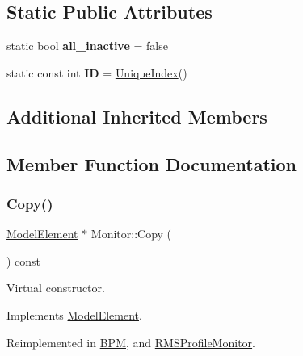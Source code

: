 \subsection*{Static Public Attributes}
\begin{DoxyCompactItemize}
\item 
\mbox{\label{classMonitor_a039390f890a247be2044b1be22611132}} 
static bool {\bfseries all\+\_\+inactive} = false
\item 
\mbox{\label{classMonitor_a4e03289570053fc98b3e290acb33868c}} 
static const int {\bfseries ID} = \hyperlink{classAcceleratorComponent_aa7ad4d39e1a488b705983842ed1ac784}{Unique\+Index}()
\end{DoxyCompactItemize}
\subsection*{Additional Inherited Members}


\subsection{Member Function Documentation}
\mbox{\label{classMonitor_a66d7932308a7206eeefc552bd3f5b1f6}} 
\subsubsection{\texorpdfstring{Copy()}{Copy()}}
{\footnotesize\ttfamily \hyperlink{classModelElement}{Model\+Element} $\ast$ Monitor\+::\+Copy (\begin{DoxyParamCaption}{ }\end{DoxyParamCaption}) const\hspace{0.3cm}{\ttfamily [virtual]}}

Virtual constructor. 

Implements \hyperlink{classModelElement_ac3ca26d649bd86a0f31a58ae09941429}{Model\+Element}.



Reimplemented in \hyperlink{classBPM_a21bba21422046a434a38268c0cb5ada6}{B\+PM}, and \hyperlink{classRMSProfileMonitor_a44abc9eaa3a638c8fffadc81a3728b6e}{R\+M\+S\+Profile\+Monitor}.

\mbox{\label{classMonitor_a38297eb50d06dd56201f2b48d92aa789}} 

